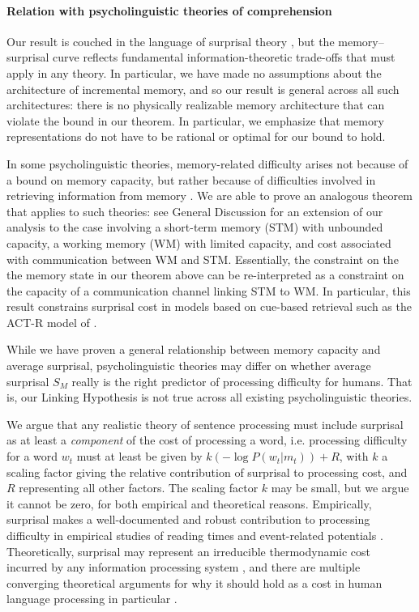 \paragraph{Relation with psycholinguistic theories of comprehension} 
Our result is couched in the language of surprisal theory \citep{hale2001probabilistic,levy2008expectation,hale2016information}, but the memory--surprisal curve reflects fundamental information-theoretic trade-offs that must apply in any theory. In particular, we have made no assumptions about the architecture of incremental memory, and so our result is general across all such architectures: there is no physically realizable memory architecture that can violate the bound in our theorem. In particular, we emphasize that memory representations do not have to be rational or optimal for our bound to hold.

In some psycholinguistic theories, memory-related difficulty arises not because of a bound on memory capacity, but rather because of difficulties involved in retrieving information from memory \citep{}. We are able to prove an analogous theorem that applies to such theories: see General Discussion for an extension of our analysis to the case involving a short-term memory (STM) with unbounded capacity, a working memory (WM) with limited capacity, and cost associated with communication between WM and STM. Essentially, the constraint on the the memory state in our theorem above can be re-interpreted as a constraint on the capacity of a communication channel linking STM to WM. In particular, this result constrains surprisal cost in models based on cue-based retrieval such as the ACT-R model of \citet{lewis-activation-based-2005}.

While we have proven a general relationship between memory capacity and average surprisal, psycholinguistic theories may differ on whether average surprisal $S_M$ really is the right predictor of processing difficulty for humans. That is, our Linking Hypothesis is not true across all existing psycholinguistic theories. 

We argue that any realistic theory of sentence processing must include surprisal as at least a \emph{component} of the cost of processing a word, i.e. processing difficulty for a word $w_t$ must at least be given by $k (-\log P(w_t |m_t)) + R$, with $k$ a scaling factor giving the relative contribution of surprisal to processing cost, and $R$ representing all other factors. The scaling factor $k$ may be small, but we argue it cannot be zero, for both empirical and theoretical reasons. Empirically, surprisal makes a well-documented and robust contribution to processing difficulty in empirical studies of reading times and event-related potentials \citep{smith2013effect,frank2016erp}. Theoretically, surprisal may represent an irreducible thermodynamic cost incurred by any information processing system \citep{brillouin,still2012thermodynamic,zenon2019information}, and there are multiple converging theoretical arguments for why it should hold as a cost in human language processing in particular \citep{levy2013memory}.

